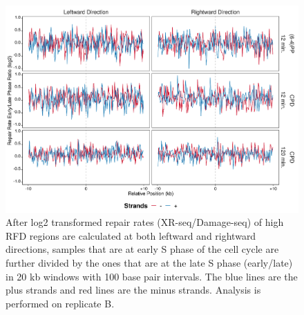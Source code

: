 \begin{figure}[H]
\begin{center}
\includegraphics[width=\textwidth]{Chapters/7_appendix/figures/supfig69}
\caption[Repair rate early/late ratio of high RFDs in 20 kb (replicate B).]{After log2 transformed repair rates (XR-seq/Damage-seq) of high RFD regions are calculated at both leftward and rightward directions, samples that are at early S phase of the cell cycle are further divided by the ones that are at the late S phase (early/late) in 20 kb windows with 100 base pair intervals. The blue lines are the plus strands and red lines are the minus strands. Analysis is performed on replicate B.}
\label{supfig:rrel20rfdB}
\end{center}
\end{figure}

